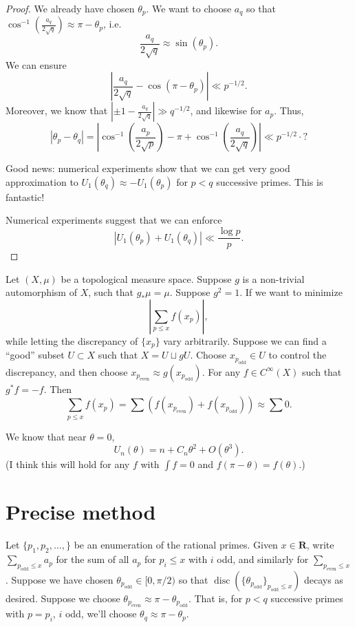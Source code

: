 \documentclass{article}
\DeclareMathOperator{\disc}{disc}
\newcommand{\bR}{\mathbf{R}}
\newcommand{\even}{\mathrm{even}}
\newcommand{\odd}{\mathrm{odd}}
\begin{document}
\begin{proof}
We already have chosen $\theta_p$. We want to choose $a_q$ so that 
$\cos^{-1}(\frac{a_q}{2\sqrt q}) \approx \pi-\theta_p$, i.e.
\[
	\frac{a_q}{2\sqrt q} \approx \sin(\theta_p) .
\]
We can ensure 
\[
	\left| \frac{a_q}{2\sqrt q} - \cos(\pi - \theta_p)\right| \ll p^{-1/2} .
\]
Moreover, we know that $|\pm 1 - \frac{a_q}{2\sqrt q}| \gg q^{-1/2}$, and 
likewise for $a_p$. Thus, 
\[
	|\theta_p - \theta_q| = \left|\cos^{-1}\left(\frac{a_p}{2\sqrt p}\right) - \pi +  \cos^{-1}\left(\frac{a_q}{2\sqrt q}\right)\right| \ll p^{-1/2} \cdot ?
\]

Good news: numerical experiments show that we can get very good approximation 
to $U_1(\theta_q) \approx - U_1(\theta_p)$ for $p<q$ successive primes. This 
is fantastic!

Numerical experiments suggest that we can enforce 
\[
	|U_1(\theta_p)+U_1(\theta_q)| \ll \frac{\log p}{p} .
\]
\end{proof}

Let $(X,\mu)$ be a topological measure space. Suppose $g$ is a non-trivial 
automorphism of $X$, such that $g_\ast \mu = \mu$. Suppose $g^2=1$. If we 
want to minimize 
\[
	\left| \sum_{p\leqslant x} f(x_p)\right| ,
\]
while letting the discrepancy of $\{x_p\}$ vary arbitrarily. Suppose we can 
find a ``good'' subset $U\subset X$ such that $X = U \sqcup g U$. Choose 
$x_{p_\odd}\in U$ to control the discrepancy, and then choose 
$x_{p_\even} \approx g(x_{p_\odd})$. For any $f\in C^\infty(X)$ such that 
$g^\ast f = - f$. Then 
\[
	\sum_{p\leqslant x} f(x_p) = \sum (f(x_{p_\even}) + f(x_{p_\odd})) \approx \sum 0 .
\]

We know that near $\theta=0$, 
\[
	U_n(\theta) = n + C_n \theta^2 + O(\theta^3) .
\]
(I think this will hold for any $f$ with $\int f=0$ and
$f(\pi-\theta)=f(\theta)$.)





\section{Precise method}

Let $\{p_1,p_2,\dots,\}$ be an enumeration of the rational primes. Given 
$x\in \bR$, write $\sum_{p_\odd \leqslant x} a_p$ for the sum of all $a_p$ 
for $p_i\leqslant x$ with $i$ odd, and similarly for 
$\sum_{p_\even\leqslant x}$. Suppose we have chosen 
$\theta_{p_\odd}\in [0,\pi/2)$ so that 
$\disc(\{\theta_{p_\odd}\}_{p_\odd \leqslant x})$ decays as desired. Suppose 
we choose $\theta_{p_\even} \approx \pi - \theta_{p_\odd}$. That is, for 
$p < q$ successive primes with $p=p_i$, $i$ odd, we'll choose 
$\theta_q \approx \pi - \theta_p$. 
\end{document}
